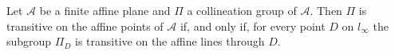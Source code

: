 Let $\mathcal{A}$ be a finite affine plane and $\Pi$ a collineation group of $\mathcal{A}$. Then $\Pi$ is transitive on the affine points of $\mathcal{A}$ if, and only if, for every point $D$ on $l_\infty$ the subgroup $\Pi_D$ is transitive on the affine lines through $D$.
